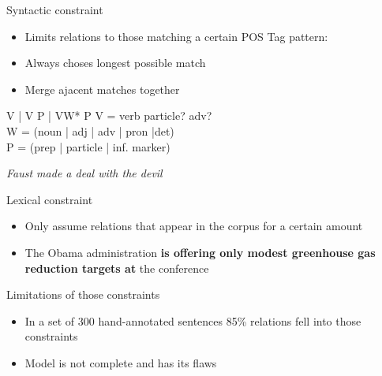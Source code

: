 \documentclass[11pt]{beamer}
\begin{document}
		
		\begin{frame}{Syntactic constraint}
			\begin{center}
				\begin{itemize}
				\item Limits relations to those matching a certain POS Tag pattern:
				\item Always choses longest possible match
				\item Merge ajacent matches together
				\end{itemize}
				\begin{block}{V | V P | VW* P}
					V = verb particle? adv?\\
					W = (noun | adj | adv | pron |det)\\
					P = (prep | particle | inf. marker)
				\end{block}
				\textit{Faust made a deal with the devil}
			\end{center}
		\end{frame}
		\begin{frame}{Lexical constraint}
			\begin{center}
				\begin{itemize}
				\item Only assume relations that appear in the corpus for a certain amount
				\item The Obama administration \textbf{is offering only modest greenhouse gas reduction targets at} the conference
				\end{itemize}
			\end{center}
		\end{frame}
		\begin{frame}{Limitations of those constraints}
			\begin{center}
				\begin{itemize}
				\item In a set of 300 hand-annotated sentences 85\% relations fell into those constraints
				\item Model is not complete and has its flaws
				
				\end{itemize}
				
			\end{center}
		\end{frame}
\end{document}
